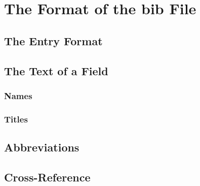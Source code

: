 \section{The Format of the bib File}
\subsection{The Entry Format}


\subsection{The Text of a Field}
\subsubsection{Names}
\subsubsection{Titles}


\subsection{Abbreviations}


\subsection{Cross-Reference}